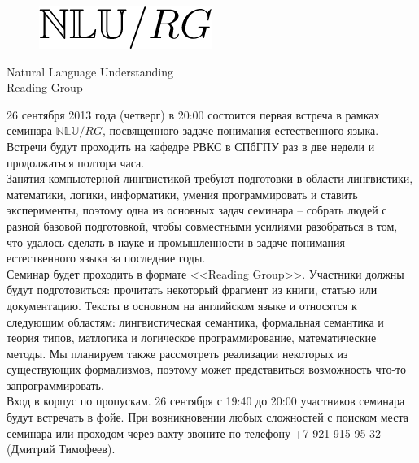 \documentclass[12pt]{article}
\begin{document}
\baselineskip 24pt

\parindent 0cm

\begin{figure}
  \begin{center}
    \includegraphics[scale=0.70]{nlu-rg-logo.png}
  \end{center}
\end{figure}

\begin{center}
{\rm \Huge{Natural Language Understanding}}\\
\bigskip
{\rm \Large Reading Group}
\end{center}

\bigskip
\bigskip

\baselineskip 15pt

26 сентября 2013 года (четверг) в 20:00 состоится первая встреча в рамках семинара $\mathbb{NLU}/RG$, посвященного задаче понимания естественного языка. Встречи будут проходить на кафедре РВКС в СПбГПУ раз в две недели и продолжаться полтора часа.\\

Занятия компьютерной лингвистикой требуют подготовки в области лингвистики, математики, логики, информатики, умения программировать и ставить эксперименты, поэтому одна из основных задач семинара -- собрать людей с разной базовой подготовкой, чтобы совместными усилиями разобраться в том, что удалось сделать в науке и промышленности в задаче понимания естественного языка за последние годы.\\

Семинар будет проходить в формате <<Reading Group>>. Участники должны будут подготовиться: прочитать некоторый фрагмент из книги, статью или документацию. Тексты в основном на английском языке и относятся к следующим областям: лингвистическая семантика, формальная семантика и теория типов, матлогика и логическое программирование, математические методы. Мы планируем также рассмотреть реализации некоторых из существующих формализмов, поэтому может представиться возможность что-то запрограммировать.\\

Вход в корпус по пропускам. 26 сентября с 19:40 до 20:00 участников семинара будут встречать в фойе. При возникновении любых сложностей с поиском места семинара или проходом через вахту звоните по телефону +7-921-915-95-32 (Дмитрий Тимофеев).\\
\end{document}
